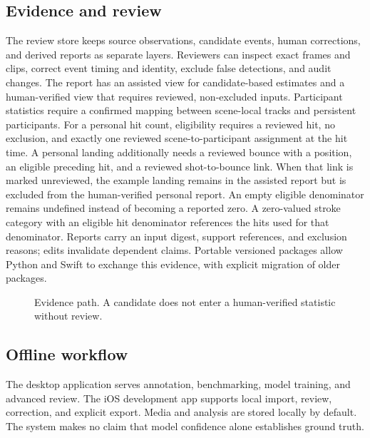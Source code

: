 \documentclass[10pt]{article}
\begin{document}
\subsection{Evidence and review}
The review store keeps source observations, candidate events, human corrections, and derived reports as separate layers. Reviewers can inspect exact frames and clips, correct event timing and identity, exclude false detections, and audit changes. The report has an assisted view for candidate-based estimates and a human-verified view that requires reviewed, non-excluded inputs. Participant statistics require a confirmed mapping between scene-local tracks and persistent participants. For a personal hit count, eligibility requires a reviewed hit, no exclusion, and exactly one reviewed scene-to-participant assignment at the hit time. A personal landing additionally needs a reviewed bounce with a position, an eligible preceding hit, and a reviewed shot-to-bounce link. When that link is marked unreviewed, the example landing remains in the assisted report but is excluded from the human-verified personal report. An empty eligible denominator remains undefined instead of becoming a reported zero. A zero-valued stroke category with an eligible hit denominator references the hits used for that denominator. Reports carry an input digest, support references, and exclusion reasons; edits invalidate dependent claims. Portable versioned packages allow Python and Swift to exchange this evidence, with explicit migration of older packages.

\begin{figure}[ht]
\centering
{}
\caption{Evidence path. A candidate does not enter a human-verified statistic without review.}
\label{fig:evidence}
\end{figure}

\subsection{Offline workflow}
The desktop application serves annotation, benchmarking, model training, and advanced review. The iOS development app supports local import, review, correction, and explicit export. Media and analysis are stored locally by default. The system makes no claim that model confidence alone establishes ground truth.
\end{document}
